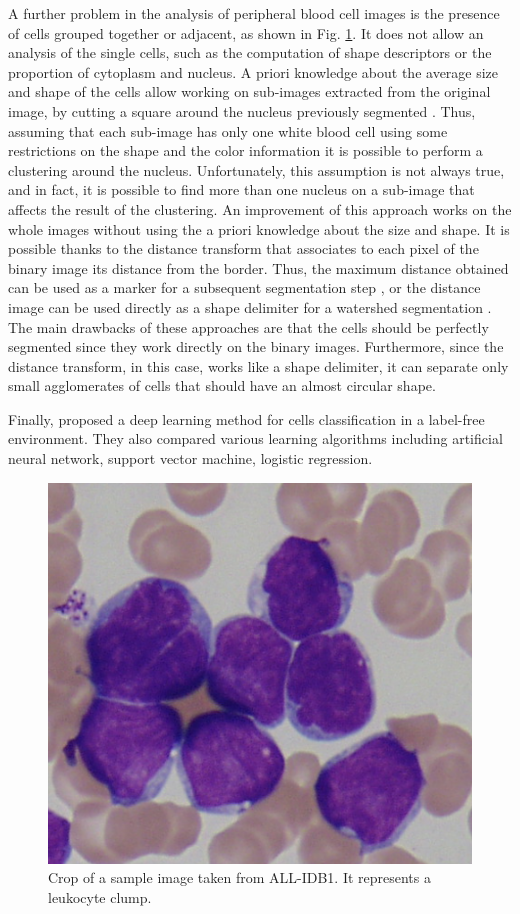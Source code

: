 A further problem in the analysis of peripheral blood cell images is the presence of cells grouped together or adjacent, as shown in Fig. \ref{fig_clumps}. It does not allow an analysis of the single cells, such as the computation of shape descriptors or the proportion of cytoplasm and nucleus. A priori knowledge about the average size and shape of the cells allow working on sub-images extracted from the original image, by cutting a square around the nucleus previously segmented \cite{Kovalev, Sinha}. Thus, assuming that each sub-image has only one white blood cell using some restrictions on the shape and the color information it is possible to perform a clustering around the nucleus. Unfortunately, this assumption is not always true, and in fact, it is possible to find more than one nucleus on a sub-image that affects the result of the clustering. An improvement of this approach works on the whole images without using the a priori knowledge about the size and shape. It is possible thanks to the distance transform \cite{Maurer} that associates to each pixel of the binary image its distance from the border. Thus, the maximum distance obtained can be used as a marker for a subsequent segmentation step \cite{Malpica}, or the distance image can be used directly as a shape delimiter for a watershed segmentation \cite{Lindblad}. The main drawbacks of these approaches are that the cells should be perfectly segmented since they work directly on the binary images. Furthermore, since the distance transform, in this case, works like a shape delimiter, it can separate only small agglomerates of cells that should have an almost circular shape.

Finally, \cite{Chen2016} proposed a deep learning method for cells classification in a label-free environment. They also compared various learning algorithms including artificial neural network, support vector machine, logistic regression.

\begin{figure}[h]
	\centering
	\includegraphics[height=0.25\textwidth]{images/2016_1_mva/clump}
	\caption[ALL-IDB1 image crop.]{\label{fig_clumps}Crop of a sample image taken from ALL-IDB1. It represents a leukocyte clump.}
\end{figure}


